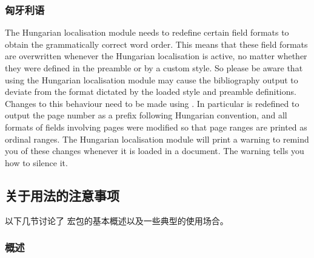 \subsubsection{匈牙利语}
\label{use:loc:hun}

The Hungarian localisation module needs to redefine certain field formats to obtain the grammatically correct word order. This means that these field formats are overwritten whenever the Hungarian localisation is active, no matter whether they were defined in the preamble or by a custom style. So please be aware that using the Hungarian localisation module may cause the bibliography output to deviate from the format dictated by the loaded style and preamble definitions. Changes to this behaviour need to be made using . In particular  is redefined to output the page number as a prefix following Hungarian convention, and all formats of fields involving pages were modified so that page ranges are printed as ordinal ranges. The Hungarian localisation module will print a warning to remind you of these changes whenever it is loaded in a document. The warning tells you how to silence it.


\subsection{关于用法的注意事项}%
\label{use:use}


以下几节讨论了 \biblatex 宏包的基本概述以及一些典型的使用场合。

\subsubsection{概述}%
\label{use:use:int}


